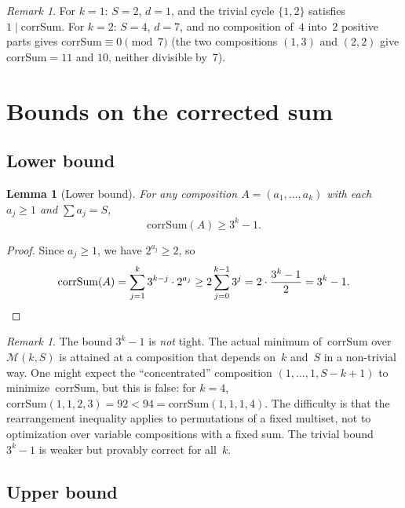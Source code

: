 \documentclass[11pt, a4paper]{amsart}
\theoremstyle{plain}
\newtheorem{lemma}[theorem]{Lemma}
\theoremstyle{definition}
\theoremstyle{remark}
\newtheorem{remark}[theorem]{Remark}
\newcommand{\corrSum}{\mathrm{corrSum}}
\newcommand{\Mono}{\mathcal{M}}
\begin{document}
\begin{remark}\label{rem:k12}
  For $k = 1$: $S = 2$, $d = 1$, and the trivial cycle
  $\{1,2\}$ satisfies $1 \mid \corrSum$.
  For $k = 2$: $S = 4$, $d = 7$, and no composition
  of~$4$ into~$2$ positive parts gives $\corrSum \equiv 0
  \pmod{7}$ (the two compositions $(1,3)$ and $(2,2)$ give
  $\corrSum = 11$ and $10$, neither divisible by~$7$).
\end{remark}

\section{Bounds on the corrected sum}\label{sec:bounds}

\subsection{Lower bound}\label{ssec:lower}

\begin{lemma}[Lower bound]\label{lem:cs-min}
  For any composition $A = (a_1, \ldots, a_k)$ with
  each $a_j \geq 1$ and $\sum a_j = S$,
  \[
    \corrSum(A) \geq 3^k - 1.
  \]
\end{lemma}

\begin{proof}
  Since $a_j \geq 1$, we have $2^{a_j} \geq 2$, so
  \[
    \corrSum(A) = \sum_{j=1}^{k} 3^{k-j} \cdot 2^{a_j}
    \geq 2 \sum_{j=0}^{k-1} 3^{j}
    = 2 \cdot \frac{3^k - 1}{2}
    = 3^k - 1. \qedhere
  \]
\end{proof}

\begin{remark}\label{rem:cs-min-tightness}
  The bound $3^k - 1$ is \emph{not} tight.  The actual minimum
  of~$\corrSum$ over~$\Mono(k,S)$ is attained at a composition
  that depends on~$k$ and~$S$ in a non-trivial way.  One might
  expect the ``concentrated'' composition $(1, \ldots, 1, S{-}k{+}1)$
  to minimize~$\corrSum$, but this is false: for $k = 4$,
  $\corrSum(1,1,2,3) = 92 < 94 = \corrSum(1,1,1,4)$.
  The difficulty is that the rearrangement inequality applies to
  permutations of a fixed multiset, not to optimization over
  variable compositions with a fixed sum.
  The trivial bound $3^k - 1$ is weaker but provably correct
  for all~$k$.
\end{remark}

\subsection{Upper bound}\label{ssec:upper}
\end{document}
